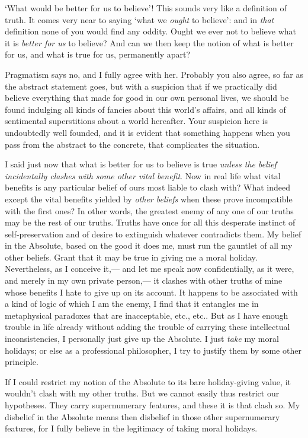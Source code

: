 \documentclass[]{article}
\begin{document}
`What would be better for us to believe'! This sounds very like a
definition of truth. It comes very near to saying `what we \emph{ought} to
believe': and in \emph{that} definition none of you would find any oddity.
Ought we ever not to believe what it is \emph{better for us} to believe? And
can we then keep the notion of what is better for us, and what is true
for us, permanently apart?

Pragmatism says no, and I fully agree with her. Probably you also agree,
so far as the abstract statement goes, but with a suspicion that if
we practically did believe everything that made for good in our own
personal lives, we should be found indulging all kinds of fancies about
this world's affairs, and all kinds of sentimental superstitions about a
world hereafter. Your suspicion here is undoubtedly well founded, and it
is evident that something happens when you pass from the abstract to the
concrete, that complicates the situation.

I said just now that what is better for us to believe is true \emph{unless the
belief incidentally clashes with some other vital benefit}. Now in real
life what vital benefits is any particular belief of ours most liable
to clash with? What indeed except the vital benefits yielded by \emph{other
beliefs} when these prove incompatible with the first ones? In other
words, the greatest enemy of any one of our truths may be the rest
of our truths. Truths have once for all this desperate instinct of
self-preservation and of desire to extinguish whatever contradicts them.
My belief in the Absolute, based on the good it does me, must run the
gauntlet of all my other beliefs. Grant that it may be true in giving me
a moral holiday. Nevertheless, as I conceive it,--- and let me speak now
confidentially, as it were, and merely in my own private person,--- it
clashes with other truths of mine whose benefits I hate to give up on
its account. It happens to be associated with a kind of logic of which I
am the enemy, I find that it entangles me in metaphysical paradoxes
that are inacceptable, etc., etc.. But as I have enough trouble in
life already without adding the trouble of carrying these intellectual
inconsistencies, I personally just give up the Absolute. I just \emph{take} my
moral holidays; or else as a professional philosopher, I try to justify
them by some other principle.

If I could restrict my notion of the Absolute to its bare holiday-giving
value, it wouldn't clash with my other truths. But we cannot easily thus
restrict our hypotheses. They carry supernumerary features, and these it
is that clash so. My disbelief in the Absolute means then disbelief
in those other supernumerary features, for I fully believe in the
legitimacy of taking moral holidays.
\end{document}
